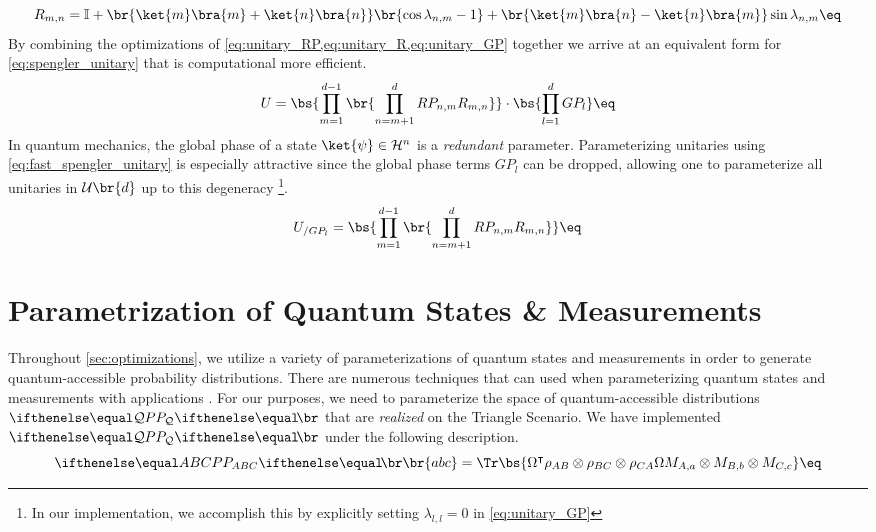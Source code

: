 \documentclass[aps, 10pt, english, twoside, pra, nofootinbib, longbibliography]{revtex4-1}
\theoremstyle{plain}
\theoremstyle{definition}
\theoremstyle{remark}
\newcommand{\Hilb}{\mathcal{H}}
\begin{document}
    \[ R_{m,n} = \mathbb{I} + \br{\ket{m}\bra{m} + \ket{n}\bra{n}} \br{\cos\lambda_{n,m} - 1} + \br{\ket{m}\bra{n} - \ket{n}\bra{m}} \sin\lambda_{n,m} \eq \label{eq:unitary_R} \]
    By combining the optimizations of \cref{eq:unitary_RP,eq:unitary_R,eq:unitary_GP} together we arrive at an equivalent form for \cref{eq:spengler_unitary} that is computational more efficient.
    \[ U = \bs{\prod_{m=1}^{d-1} \br{\prod_{n=m+1}^{d} RP_{n,m}R_{m,n}}} \cdot \bs{\prod_{l=1}^{d} GP_l} \eq \label{eq:fast_spengler_unitary} \]
    In quantum mechanics, the global phase of a state $\ket{\psi} \in \Hilb^n$ is a \textit{redundant} parameter. Parameterizing unitaries using \cref{eq:fast_spengler_unitary} is especially attractive since the global phase terms $GP_l$ can be dropped, allowing one to parameterize all unitaries in $\mathcal{U}\br{d}$ up to this degeneracy \cite{Spengler_2010_Unitary}\footnote{In our implementation, we accomplish this by explicitly setting $\lambda_{l,l} = 0$ in \cref{eq:unitary_GP}}.
    \[ U_{/ GP_l} = \bs{\prod_{m=1}^{d-1} \br{\prod_{n=m+1}^{d} RP_{n,m}R_{m,n}}} \eq \label{eq:fast_spengler_unitary_gp} \]

    \section{Parametrization of Quantum States \& Measurements}
    Throughout \cref{sec:optimizations}, we utilize a variety of parameterizations of quantum states and measurements in order to generate quantum-accessible probability distributions. There are numerous techniques that can used when parameterizing quantum states and measurements \cite{Petz_2015, Hedemann_2013,Spengler_2010_Unitary,Fujii_2005,James_2001} with applications . For our purposes, we need to parameterize the space of quantum-accessible distributions $\prob[\mathcal{Q}]$ that are \textit{realized} on the Triangle Scenario. We have implemented $\prob[\mathcal{Q}]$ under the following description.
    \[ \prob[ABC]\br{abc} = \Tr\bs{\Omega^\intercal \rho_{AB}\otimes\rho_{BC}\otimes\rho_{CA} \Omega M_{A,a}\otimes M_{B,b} \otimes M_{C,c}} \eq \label{eq:triangle_quantum_distributions} \]
\end{document}
